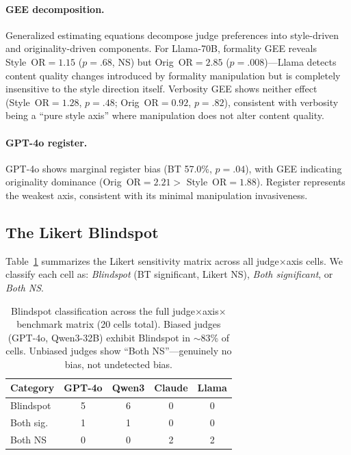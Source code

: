 \documentclass[11pt]{article}
\begin{document}
\paragraph{GEE decomposition.} Generalized estimating equations decompose judge preferences into style-driven and originality-driven components. For Llama-70B, formality GEE reveals Style~OR$=1.15$ ($p=.68$, NS) but Orig~OR$=2.85$ ($p=.008$)---Llama detects content quality changes introduced by formality manipulation but is completely insensitive to the style direction itself. Verbosity GEE shows neither effect (Style~OR$=1.28$, $p=.48$; Orig~OR$=0.92$, $p=.82$), consistent with verbosity being a ``pure style axis'' where manipulation does not alter content quality.

\paragraph{GPT-4o register.} GPT-4o shows marginal register bias (BT 57.0\%, $p=.04$), with GEE indicating originality dominance (Orig~OR$=2.21 >$ Style~OR$=1.88$). Register represents the weakest axis, consistent with its minimal manipulation invasiveness.

\subsection{The Likert Blindspot}
\label{sec:blindspot}

Table~\ref{tab:blindspot} summarizes the Likert sensitivity matrix across all judge$\times$axis cells. We classify each cell as: \emph{Blindspot} (BT significant, Likert NS), \emph{Both significant}, or \emph{Both NS}.

\begin{table}[t]
\centering
\small
\begin{tabular}{lcccc}
\toprule
\textbf{Category} & \textbf{GPT-4o} & \textbf{Qwen3} & \textbf{Claude} & \textbf{Llama} \\
\midrule
Blindspot & 5 & 6 & 0 & 0 \\
Both sig. & 1 & 1 & 0 & 0 \\
Both NS & 0 & 0 & 2 & 2 \\
\bottomrule
\end{tabular}
\caption{Blindspot classification across the full judge$\times$axis$\times$benchmark matrix (20 cells total). Biased judges (GPT-4o, Qwen3-32B) exhibit Blindspot in $\sim$83\% of cells. Unbiased judges show ``Both NS''---genuinely no bias, not undetected bias.}
\label{tab:blindspot}
\end{table}
\end{document}
